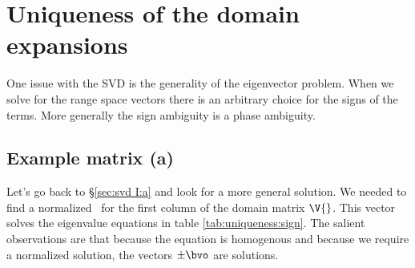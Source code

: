 \section{Uniqueness of the domain expansions}
\label{sec:computing III:uniqueness}
One issue with the SVD is the generality of the eigenvector problem. When we solve for the range space vectors there is an arbitrary choice for the signs of the terms. More generally the sign  ambiguity is a phase ambiguity.

\subsection{Example matrix (a)}
Let's go back to \S \eqref{sec:svd I:a} and look for a more general solution. We needed to find a normalized \vvv \ for the first column of the domain matrix $\V{}$. This vector solves the eigenvalue equations in table \eqref{tab:uniqueness:sign}. The salient observations are that because the equation is homogenous and because we require a normalized solution, the vectors $\pm \bvo$ are solutions.


